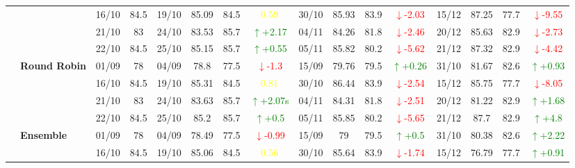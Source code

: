 \documentclass{ieeeaccess}
\begin{document}
{\begin{longtable}{llcc|cccc|cccc|cccc}
&
& 16/10 & 84.5 & 19/10 & 85.09 & 84.5 & \textcolor{yellow}{0.59} & 30/10 & 85.93 & 83.9 & \textcolor{red}{\(\downarrow\)-2.03} & 15/12 & 87.25 & 77.7 & \textcolor{red}{\(\downarrow\)-9.55} \\

&
& 21/10 & 83 & 24/10 & 83.53 & 85.7 & \textcolor{green}{\(\uparrow\)+2.17} & 04/11 & 84.26 & 81.8 & \textcolor{red}{\(\downarrow\)-2.46} & 20/12 & 85.63 & 82.9 & \textcolor{red}{\(\downarrow\)-2.73} \\

&
& 22/10 & 84.5 & 25/10 & 85.15 & 85.7 & \textcolor{green}{\(\uparrow\)+0.55} & 05/11 & 85.82 & 80.2 & \textcolor{red}{\(\downarrow\)-5.62} & 21/12 & 87.32 & 82.9 & \textcolor{red}{\(\downarrow\)-4.42} \\
\cmidrule(lr){2-16}


& \textbf{Round Robin}
& 01/09 & 78 & 04/09 & 78.8 & 77.5 & \textcolor{red}{\(\downarrow\)-1.3} & 15/09 & 79.76 & 79.5 & \textcolor{green}{\(\uparrow\)+0.26} & 31/10 & 81.67 & 82.6 & \textcolor{green}{\(\uparrow\)+0.93} \\

&
& 16/10 & 84.5 & 19/10 & 85.31 & 84.5 & \textcolor{yellow}{0.81} & 30/10 & 86.44 & 83.9 & \textcolor{red}{\(\downarrow\)-2.54} & 15/12 & 85.75 & 77.7 & \textcolor{red}{\(\downarrow\)-8.05} \\

&
& 21/10 & 83 & 24/10 & 83.63 & 85.7 & \textcolor{green}{\(\uparrow\)+2.07s} & 04/11 & 84.31 & 81.8 & \textcolor{red}{\(\downarrow\)-2.51} & 20/12 & 81.22 & 82.9 & \textcolor{green}{\(\uparrow\)+1.68} \\

&
& 22/10 & 84.5 & 25/10 & 85.2 & 85.7 & \textcolor{green}{\(\uparrow\)+0.5} & 05/11 & 85.85 & 80.2 & \textcolor{red}{\(\downarrow\)-5.65} & 21/12 & 87.7 & 82.9 & \textcolor{green}{\(\uparrow\)+4.8} \\
\cmidrule(lr){2-16}




& \textbf{Ensemble}
& 01/09 & 78 & 04/09 & 78.49 & 77.5 & \textcolor{red}{\(\downarrow\)-0.99} & 15/09 & 79 & 79.5 & \textcolor{green}{\(\uparrow\)+0.5} & 31/10 & 80.38 & 82.6 & \textcolor{green}{\(\uparrow\)+2.22} \\

&
& 16/10 & 84.5 & 19/10 & 85.06 & 84.5 & \textcolor{yellow}{0.56} & 30/10 & 85.64 & 83.9 & \textcolor{red}{\(\downarrow\)-1.74} & 15/12 & 76.79 & 77.7 & \textcolor{green}{\(\uparrow\)+0.91} \\


\end{longtable}}
\end{document}
